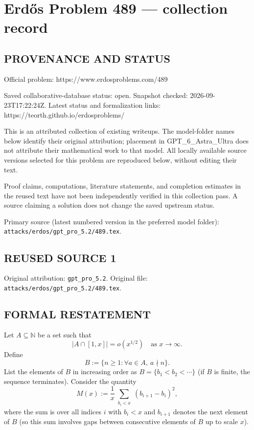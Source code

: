 \section*{Erd\H{o}s Problem 489 --- collection record}

\subsection*{PROVENANCE AND STATUS}
Official problem: https://www.erdosproblems.com/489

Saved collaborative-database status: open.
Snapshot checked: 2026-09-23T17:22:24Z.
Latest status and formalization links: https://teorth.github.io/erdosproblems/

This is an attributed collection of existing writeups. The model-folder names below identify their original attribution; placement in GPT\_6\_Astra\_Ultra does not attribute their mathematical work to that model. All locally available source versions selected for this problem are reproduced below, without editing their text.

Proof claims, computations, literature statements, and completion estimates in the reused text have not been independently verified in this collection pass. A source claiming a solution does not change the saved upstream status.

Primary source (latest numbered version in the preferred model folder): \texttt{attacks/erdos/gpt\_pro\_5.2/489.tex}.

\subsection*{REUSED SOURCE 1}
Original attribution: \texttt{gpt\_pro\_5.2}.
Original file: \texttt{attacks/erdos/gpt\_pro\_5.2/489.tex}.


\subsection*{FORMAL RESTATEMENT}
Let $A\subseteq\mathbb{N}$ be a set such that
\[|A\cap[1,x]| = o(x^{1/2})\quad\text{as }x\to\infty.
\]
Define
\[B := \{ n\ge 1 : \forall a\in A,\ a\nmid n\}.
\]
List the elements of $B$ in increasing order as $B=\{b_1<b_2<\cdots\}$ (if $B$ is finite, the sequence terminates).
Consider the quantity
\[M(x):=\frac{1}{x}\sum_{\substack{b_i<x}}(b_{i+1}-b_i)^2,\]
where the sum is over all indices $i$ with $b_i<x$ and $b_{i+1}$ denotes the next element of $B$ (so this sum involves gaps between consecutive elements of $B$ up to scale $x$).

